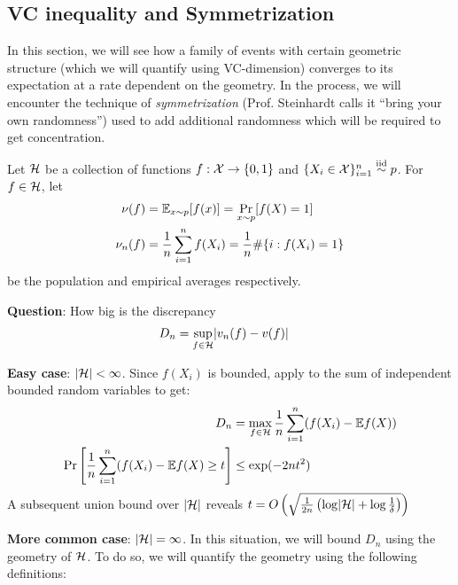 \subsection{VC inequality and Symmetrization}

In this section, we will see how a family of events with certain geometric structure (which we will
quantify using VC-dimension) converges to its expectation at a rate dependent on the geometry.
In the process, we will encounter the technique of \emph{symmetrization}
(Prof. Steinhardt calls it ``bring your own randomness'') used to add additional randomness which
will be required to get concentration.

Let $\mathcal{H}$ be a collection of functions $f : \mathcal{X} \to \{0,1\}$ and $\{X_i \in \mathcal{X}\}_{i=1}^n \overset{\text{iid}}{\sim} p$.
For $f \in \mathcal{H}$, let
\begin{align}
    \nu(f) &= \mathbb{E}_{x \sim p}[ f(x)] = \Pr_{x \sim p}[f(X) = 1] \\
    \nu_n(f) &= \frac{1}{n} \sum_{i=1}^n f(X_i) = \frac{1}{n} \#\{i : f(X_i) = 1\}
\end{align}
be the population and empirical averages respectively.

\textbf{Question}: How big is the discrepancy
\begin{align}
    D_n &= \sup_{f \in \mathcal{H}} \lvert v_n(f) - v(f) \rvert
\end{align}

\textbf{Easy case}: $\lvert \mathcal{H} \rvert < \infty$. Since $f(X_i)$ is bounded, apply 
to the sum of independent bounded random variables to get:
\begin{align}
    D_n &= \max_{f \in \mathcal{H}} \frac{1}{n} \sum_{i=1}^n (f(X_i) - \mathbb{E} f(X)) \\
    \Pr\left[\frac{1}{n} \sum_{i=1}^n (f(X_i) - \mathbb{E} f(X) \geq t \right] &\leq \exp(-2 n t^2)
\end{align}
A subsequent union bound over $\lvert \mathcal{H} \rvert$ reveals
$t = O\left(\sqrt{\frac{1}{2n} \left( \log \lvert \mathcal{H} \rvert + \log \frac{1}{\delta} \right)}\right)$

\textbf{More common case}: $\lvert \mathcal{H} \rvert = \infty$.
In this situation, we will bound $D_n$ using the geometry of $\mathcal{H}$.
To do so, we will quantify the geometry using the following definitions:

